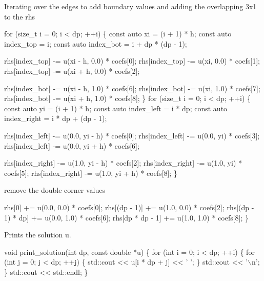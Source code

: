{\ttfamily  Iterating over the edges to add boundary values and adding the overlapping 3x1 to the rhs}

{\ttfamily 
\begin{DoxyCode}
\textcolor{keywordflow}{for} (\textcolor{keywordtype}{size\_t} i = 0; i < dp; ++i) \{
    \textcolor{keyword}{const} \textcolor{keyword}{auto} xi = (i + 1) * h;
    \textcolor{keyword}{const} \textcolor{keyword}{auto} index\_top = i;
    \textcolor{keyword}{const} \textcolor{keyword}{auto} index\_bot = i + dp * (dp - 1);

    rhs[index\_top] -= u(xi - h, 0.0) * coefs[0];
    rhs[index\_top] -= u(xi, 0.0) * coefs[1];
    rhs[index\_top] -= u(xi + h, 0.0) * coefs[2];

    rhs[index\_bot] -= u(xi - h, 1.0) * coefs[6];
    rhs[index\_bot] -= u(xi, 1.0) * coefs[7];
    rhs[index\_bot] -= u(xi + h, 1.0) * coefs[8];
\}
\textcolor{keywordflow}{for} (\textcolor{keywordtype}{size\_t} i = 0; i < dp; ++i) \{
    \textcolor{keyword}{const} \textcolor{keyword}{auto} yi = (i + 1) * h;
    \textcolor{keyword}{const} \textcolor{keyword}{auto} index\_left = i * dp;
    \textcolor{keyword}{const} \textcolor{keyword}{auto} index\_right = i * dp + (dp - 1);

    rhs[index\_left] -= u(0.0, yi - h) * coefs[0];
    rhs[index\_left] -= u(0.0, yi) * coefs[3];
    rhs[index\_left] -= u(0.0, yi + h) * coefs[6];

    rhs[index\_right] -= u(1.0, yi - h) * coefs[2];
    rhs[index\_right] -= u(1.0, yi) * coefs[5];
    rhs[index\_right] -= u(1.0, yi + h) * coefs[8];
\}
\end{DoxyCode}
}

{\ttfamily  remove the double corner values}

{\ttfamily 
\begin{DoxyCode}
    rhs[0] += u(0.0, 0.0) * coefs[0];
    rhs[(dp - 1)] += u(1.0, 0.0) * coefs[2];
    rhs[(dp - 1) * dp] += u(0.0, 1.0) * coefs[6];
    rhs[dp * dp - 1] += u(1.0, 1.0) * coefs[8];
\}
\end{DoxyCode}
}

{\ttfamily  Prints the solution {\ttfamily u}.}

{\ttfamily 
\begin{DoxyCode}
\textcolor{keywordtype}{void} print\_solution(\textcolor{keywordtype}{int} dp, \textcolor{keyword}{const} \textcolor{keywordtype}{double} *u)
\{
    \textcolor{keywordflow}{for} (\textcolor{keywordtype}{int} i = 0; i < dp; ++i) \{
        \textcolor{keywordflow}{for} (\textcolor{keywordtype}{int} j = 0; j < dp; ++j) \{
            std::cout << u[i * dp + j] << \textcolor{charliteral}{' '};
        \}
        std::cout << \textcolor{charliteral}{'\(\backslash\)n'};
    \}
    std::cout << std::endl;
\}
\end{DoxyCode}
}

